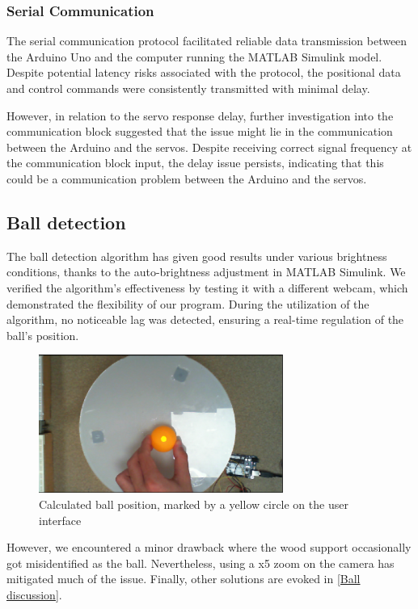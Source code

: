\subsubsection{Serial Communication}

The serial communication protocol facilitated reliable data transmission between the Arduino Uno and the computer running the MATLAB Simulink model. Despite potential latency risks associated with the protocol, the positional data and control commands were consistently transmitted with minimal delay.\newline

However, in relation to the servo response delay, further investigation into the communication block suggested that the issue might lie in the communication between the Arduino and the servos. Despite receiving correct signal frequency at the communication block input, the delay issue persists, indicating that this could be a communication problem between the Arduino and the servos.\newline

\subsection{Ball detection}\label{Ball detection}
The ball detection algorithm has given good results under various brightness conditions, thanks to the auto-brightness adjustment in MATLAB Simulink. We verified the algorithm's effectiveness by testing it with a different webcam, which demonstrated the flexibility of our program.\newline
 During the utilization of the algorithm, no noticeable lag was detected, ensuring a real-time regulation of the ball's position.\newline
\begin{center}
    \begin{figure}[ht!]
        \centering
        \includegraphics[width=8cm, keepaspectratio]{imports/Pos_BALL_usr.png}
        \caption{Calculated ball position, marked by a yellow circle on the user interface}
    \end{figure}
\end{center}
However, we encountered a minor drawback where the wood support occasionally got misidentified as the ball. Nevertheless, using a x5 zoom on the camera has mitigated much of the issue. Finally, other solutions are evoked in \ref{Ball discussion}. 


